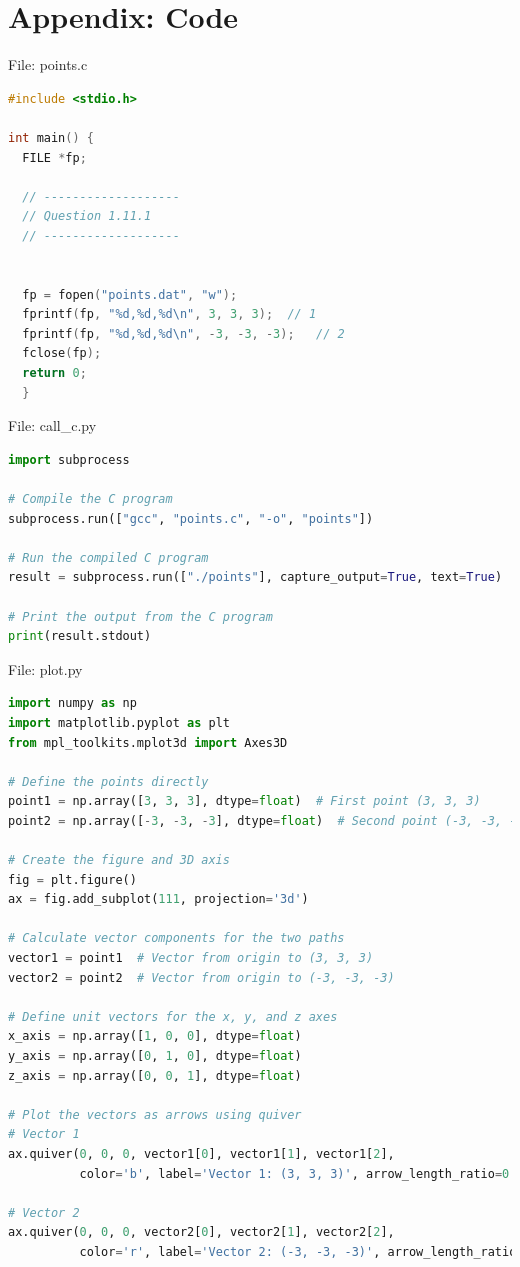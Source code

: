 \documentclass{beamer}
\numberwithin{equation}{section}
\theoremstyle{remark}
\begin{document}
\section*{Appendix: Code}

\begin{frame}[fragile]{File: points.c}
\begin{lstlisting}[language=C]
#include <stdio.h>

int main() {
  FILE *fp;

  // -------------------
  // Question 1.11.1
  // -------------------


  fp = fopen("points.dat", "w");
  fprintf(fp, "%d,%d,%d\n", 3, 3, 3);  // 1
  fprintf(fp, "%d,%d,%d\n", -3, -3, -3);   // 2
  fclose(fp);
  return 0;
  }
\end{lstlisting}
\end{frame}

\begin{frame}[fragile]{File: call\_c.py}
\begin{lstlisting}[language=Python]
import subprocess

# Compile the C program
subprocess.run(["gcc", "points.c", "-o", "points"])

# Run the compiled C program
result = subprocess.run(["./points"], capture_output=True, text=True)

# Print the output from the C program
print(result.stdout)
\end{lstlisting}
\end{frame}

\begin{frame}[fragile]{File: plot.py}
\begin{lstlisting}[language=Python]
import numpy as np
import matplotlib.pyplot as plt
from mpl_toolkits.mplot3d import Axes3D

# Define the points directly
point1 = np.array([3, 3, 3], dtype=float)  # First point (3, 3, 3)
point2 = np.array([-3, -3, -3], dtype=float)  # Second point (-3, -3, -3)

# Create the figure and 3D axis
fig = plt.figure()
ax = fig.add_subplot(111, projection='3d')

# Calculate vector components for the two paths
vector1 = point1  # Vector from origin to (3, 3, 3)
vector2 = point2  # Vector from origin to (-3, -3, -3)

# Define unit vectors for the x, y, and z axes
x_axis = np.array([1, 0, 0], dtype=float)
y_axis = np.array([0, 1, 0], dtype=float)
z_axis = np.array([0, 0, 1], dtype=float)

# Plot the vectors as arrows using quiver
# Vector 1
ax.quiver(0, 0, 0, vector1[0], vector1[1], vector1[2],
          color='b', label='Vector 1: (3, 3, 3)', arrow_length_ratio=0.1)

# Vector 2
ax.quiver(0, 0, 0, vector2[0], vector2[1], vector2[2],
          color='r', label='Vector 2: (-3, -3, -3)', arrow_length_ratio=0.1)
\end{lstlisting}
\end{frame}
\end{document}
